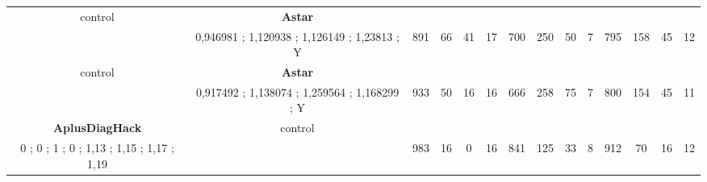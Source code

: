 \begin{table}[]
{\begin{tabular}{|c|c|c|c|c|c|c|c|c|c|c|c|c|c|}
control & \cellcolor{blue!15}\textbf{Astar}& {\color[HTML]{00009B} } & {\color[HTML]{9A0000} } & {\color[HTML]{009901} } &  & {\color[HTML]{00009B} } & {\color[HTML]{9A0000} } & {\color[HTML]{009901} } &  & {\color[HTML]{00009B} } & {\color[HTML]{9A0000} } & {\color[HTML]{009901} } &  \\ 
 & \cellcolor{ blue!15}0,946981 ; 1,120938 ; 1,126149 ; 1,23813 ; Y & \multirow{-2}{*}{{\color[HTML]{00009B} 891}} & \multirow{-2}{*}{{\color[HTML]{9A0000} 66}} & \multirow{-2}{*}{{\color[HTML]{009901} 41}} & \multirow{-2}{*}{17} & \multirow{-2}{*}{{\color[HTML]{00009B} 700}} & \multirow{-2}{*}{{\color[HTML]{9A0000} 250}} & \multirow{-2}{*}{{\color[HTML]{009901} 50}} & \multirow{-2}{*}{7} & \multirow{-2}{*}{{\color[HTML]{00009B} 795}} & \multirow{-2}{*}{{\color[HTML]{9A0000} 158}} & \multirow{-2}{*}{{\color[HTML]{009901} 45}} & \multirow{-2}{*}{12} \\ \hline

control & \cellcolor{blue!15}\textbf{Astar}& {\color[HTML]{00009B} } & {\color[HTML]{9A0000} } & {\color[HTML]{009901} } &  & {\color[HTML]{00009B} } & {\color[HTML]{9A0000} } & {\color[HTML]{009901} } &  & {\color[HTML]{00009B} } & {\color[HTML]{9A0000} } & {\color[HTML]{009901} } &  \\ 
 & \cellcolor{ blue!15}0,917492 ; 1,138074 ; 1,259564 ; 1,168299 ; Y & \multirow{-2}{*}{{\color[HTML]{00009B} 933}} & \multirow{-2}{*}{{\color[HTML]{9A0000} 50}} & \multirow{-2}{*}{{\color[HTML]{009901} 16}} & \multirow{-2}{*}{16} & \multirow{-2}{*}{{\color[HTML]{00009B} 666}} & \multirow{-2}{*}{{\color[HTML]{9A0000} 258}} & \multirow{-2}{*}{{\color[HTML]{009901} 75}} & \multirow{-2}{*}{7} & \multirow{-2}{*}{{\color[HTML]{00009B} 800}} & \multirow{-2}{*}{{\color[HTML]{9A0000} 154}} & \multirow{-2}{*}{{\color[HTML]{009901} 45}} & \multirow{-2}{*}{11} \\ \hline


\cellcolor{blue!15}\textbf{AplusDiagHack} & control& {\color[HTML]{00009B} } & {\color[HTML]{9A0000} } & {\color[HTML]{009901} } &  & {\color[HTML]{00009B} } & {\color[HTML]{9A0000} } & {\color[HTML]{009901} } &  & {\color[HTML]{00009B} } & {\color[HTML]{9A0000} } & {\color[HTML]{009901} } &  \\ 
\cellcolor{ blue!15}0 ; 0 ; 1 ; 0 ; 1,13 ; 1,15 ; 1,17 ; 1,19 &  & \multirow{-2}{*}{{\color[HTML]{00009B} 983}} & \multirow{-2}{*}{{\color[HTML]{9A0000} 16}} & \multirow{-2}{*}{{\color[HTML]{009901} 0}} & \multirow{-2}{*}{16} & \multirow{-2}{*}{{\color[HTML]{00009B} 841}} & \multirow{-2}{*}{{\color[HTML]{9A0000} 125}} & \multirow{-2}{*}{{\color[HTML]{009901} 33}} & \multirow{-2}{*}{8} & \multirow{-2}{*}{{\color[HTML]{00009B} 912}} & \multirow{-2}{*}{{\color[HTML]{9A0000} 70}} & \multirow{-2}{*}{{\color[HTML]{009901} 16}} & \multirow{-2}{*}{12} \\ \hline


\end{tabular}}
\end{table}
